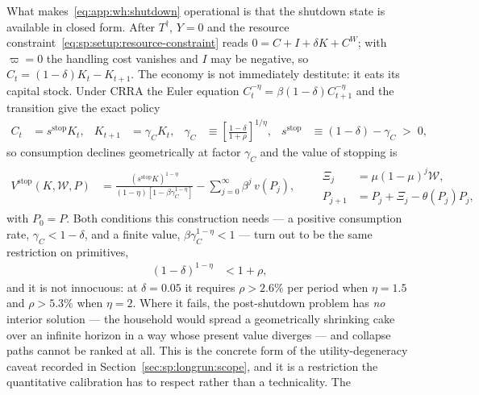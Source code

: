  What makes~\eqref{eq:app:wh:shutdown} operational is that the shutdown state is available in closed form. After $T^\dagger$, $Y=0$ and the resource constraint~\eqref{eq:sp:setup:resource-constraint} reads $0=C+I+\delta K+C^W$; with $\varpi=0$ the handling cost vanishes and $I$ may be negative, so $C_t=\left(1-\delta\right)K_t-K_{t+1}$. The economy is not immediately destitute: it eats its capital stock. Under CRRA the Euler equation $C_t^{-\eta}=\beta\left(1-\delta\right)C_{t+1}^{-\eta}$ and the transition give the exact policy
\begin{align}
C_t &= s^{\mathrm{stop}}K_t,
&
K_{t+1} &= \gamma_C K_t,
&
\gamma_C &\equiv\left[\frac{1-\delta}{1+\rho}\right]^{1/\eta},
&
s^{\mathrm{stop}} &\equiv \left(1-\delta\right)-\gamma_C\;>\;0,
\label{eq:app:wh:cake}
\end{align}
so consumption declines geometrically at factor $\gamma_C$ and the value of stopping is
\begin{align}
V^{\mathrm{stop}}\!\left(K,\mathcal W,P\right) &=
\frac{\left(s^{\mathrm{stop}}K\right)^{1-\eta}}{\left(1-\eta\right)\left[1-\beta\gamma_C^{1-\eta}\right]}
-\sum_{j=0}^{\infty}\beta^{j}\,v\!\left(P_j\right),
\qquad
\begin{aligned}
\Xi_j &= \mu\left(1-\mu\right)^{j}\mathcal W,\\
P_{j+1} &= P_j+\Xi_j-\theta\!\left(P_j\right)P_j,
\end{aligned}
\label{eq:app:wh:Vstop}
\end{align}
with $P_0=P$. Both conditions this construction needs --- a positive consumption rate,
$\gamma_C<1-\delta$, and a finite value, $\beta\gamma_C^{1-\eta}<1$ --- turn out to be the same
restriction on primitives,
\begin{align}
\left(1-\delta\right)^{1-\eta} &< 1+\rho ,
\label{eq:app:wh:cake-condition}
\end{align}
and it is not innocuous: at $\delta=0.05$ it requires $\rho>2.6\%$ per period when $\eta=1.5$ and
$\rho>5.3\%$ when $\eta=2$. Where it fails, the post-shutdown problem has \emph{no} interior
solution --- the household would spread a geometrically shrinking cake over an infinite horizon in a
way whose present value diverges --- and collapse paths cannot be ranked at all. This is the
concrete form of the utility-degeneracy caveat recorded in Section~\ref{sec:sp:longrun:scope}, and
it is a restriction the quantitative calibration has to respect rather than a technicality. The
